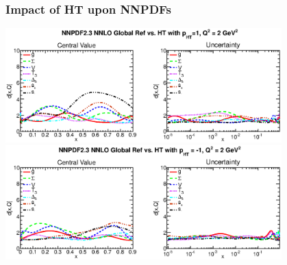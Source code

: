 \documentclass[10pt]{beamer}
\begin{document}
%


\begin{frame}
\frametitle{Impact of HT upon NNPDFs}
  \begin{center}    \includegraphics[width=0.8\textwidth]{distances-nnpdf23-global-ref-vs-htp1-2gev2.eps} \\
\includegraphics[width=0.8\textwidth]{distances-nnpdf23-global-ref-vs-htm1-2gev2.eps} \end{center}
\end{frame}
\end{document}
